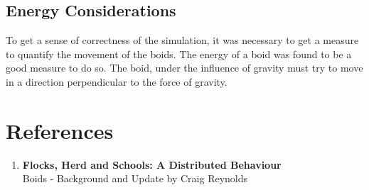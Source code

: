 \documentclass[12pt]{report}
\begin{document}
\subsection*{Energy Considerations}
To get a sense of correctness of the simulation, it was necessary to get a measure to quantify the movement of the boids. The energy of a boid was found to be a good measure to do so. The boid, under the influence of gravity must try to move in a direction perpendicular to the force of gravity. 


\newpage
\section*{References}
\begin{enumerate}
\item  \textbf{Flocks, Herd and Schools: A Distributed Behaviour} \\
Boids - Background and Update by Craig Reynolds
\end{enumerate}
\end{document}
